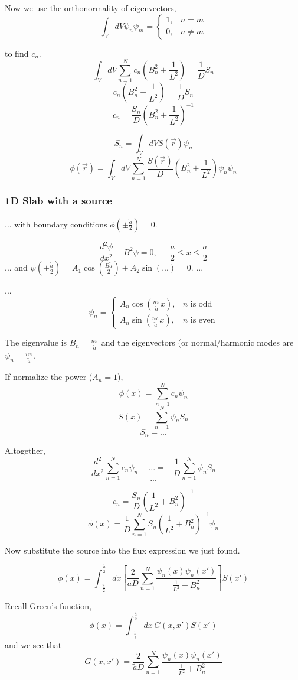 \documentclass{report}
\newcommand{\hhh}[1]{\subsubsection*{#1}}
\newcommand{\pos}{\vec{r}}
\newcommand{\oneDgreens}{G(x,x')}
\begin{document}
Now we use the orthonormality of eigenvectors,
$$ \int_V dV \psi_n \psi_m =	\begin{cases}	1, & n=m \\
												0, & n \neq m
								\end{cases}$$
											
to find $c_n$.
$$ \int_V dV \sum_{n=1}^N c_n \left(B_n^2 + \frac{1}{L^2} \right) = \frac{1}{D} S_n $$
$$ c_n \left(B_n^2 + \frac{1}{L^2}\right) = \frac{1}{D} S_n $$
$$ c_n = \frac{S_n}{D}\left(B_n^2 + \frac{1}{L^2}\right)^{-1} $$

$$ S_n = \int_V dV S(\pos) \psi_n $$
$$ \phi(\pos) = \int_V dV \sum_{n=1}^N \frac{S(\pos)}{D}\left(B_n^2 + \frac{1}{L^2}\right)\psi_n \psi_n $$

\hhh{1D Slab with a source}
...
with boundary conditions $\phi(\pm\tilde{\frac{a}{2}}) = 0$.

$$ \frac{d^2\psi}{dx^2} - B^2\psi = 0, \; -\frac{a}{2} \leq x \leq \frac{a}{2} $$
...
and $\psi(\pm\frac{\tilde{a}}{2}) = A_1 \cos(\frac{B\tilde{a}}{2}) + A_2\sin(...) = 0 $.
...

...
$$ \psi_n =	\begin{cases}	A_n\cos(\frac{n\pi}{\tilde{a}}x),	& n \text{ is odd} \\
							A_n\sin(\frac{n\pi}{\tilde{a}}x), 	& n \text{ is even}						\end{cases}$$
							
The eigenvalue is $B_n = \frac{n\pi}{\tilde{a}}$ and the eigenvectors (or normal/harmonic modes are $\psi_n = \frac{n\pi}{\tilde{a}}$.

If normalize the power ($A_n = 1$),
$$ \phi(x) = \sum_{n=1}^N c_n \psi_n $$
$$ S(x) = \sum_{n=1}^N \psi_n S_n $$
$$ S_n = ... $$

Altogether,
$$ \frac{d^2}{dx^2} \sum_{n=1}^N c_n \psi_n - ... = -\frac{1}{D}\sum_{n=1}^N \psi_n S_n $$
$$ ... $$

$$ c_n = \frac{S_n}{D}\left(\frac{1}{L^2} + B_n^2\right)^{-1} $$
$$ \phi(x) = \frac{1}{D}\sum_{n=1}^N S_n\left( \frac{1}{L^2} + B_n^2 \right)^{-1} \psi_n $$

Now substitute the source into the flux expression we just found.

$$ \phi(x) = \int_{-\frac{\tilde{a}}{2}}^{\frac{\tilde{a}}{2}} dx \left[ \frac{2}{\tilde{a}D} \sum_{n=1}^N \frac{\psi_n(x)\psi_n(x')}{\frac{1}{L^2} + B_n^2 }\right] S(x') $$

Recall Green's function,
$$ \phi(x) = \int_{-\frac{\tilde{a}}{2}}^{\frac{\tilde{a}}{2}} dx \,\oneDgreens S(x') $$
and we see that 
$$ \oneDgreens = \frac{2}{\tilde{a}D} \sum_{n=1}^N \frac{\psi_n(x)\psi_n(x')}{\frac{1}{L^2} + B_n^2 }$$
\end{document}
